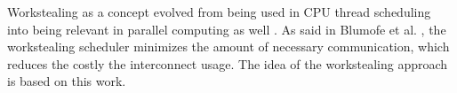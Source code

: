 Workstealing as a concept evolved from being used in CPU thread scheduling \cite{blumofeSchedulingMultithreadedComputations1999} into being relevant in parallel computing as well \cite{letzWorkStealingScheduler2010,mattheisWorkStealingStrategies2012,prellEmbracingExplicitCommunication2016}. As said in Blumofe et al. \cite{blumofeSchedulingMultithreadedComputations1999}, the workstealing scheduler minimizes the amount of necessary communication, which reduces the costly the interconnect usage. The idea of the workstealing approach is based on this work.

